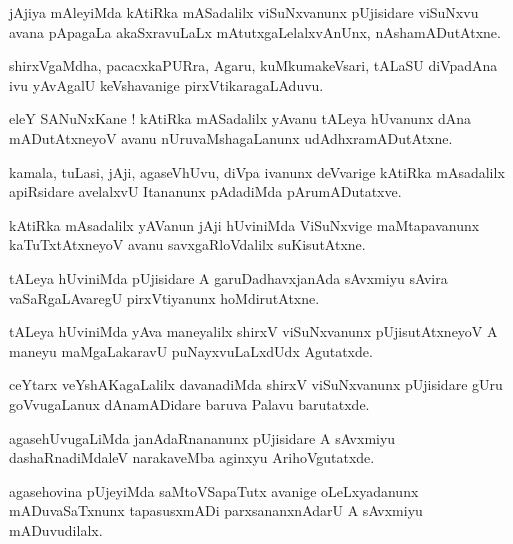 \documentclass{article}
\begin{document}
\begin{mn}%
jAjiya mAleyiMda kAtiRka mASadalilx viSuNxvanunx pUjisidare viSuNxvu avana pApagaLa akaSxravuLaLx 
mAtutxgaLelalxvAnUnx, nAshamADutAtxne.
\end{mn}

\begin{mn}%
shirxVgaMdha, pacacxkaPURra, Agaru, kuMkumakeVsari, tALaSU diVpadAna ivu yAvAgalU keVshavanige 
pirxVtikaragaLAduvu.
\end{mn}

\begin{mn}%
eleY SANuNxKane ! kAtiRka mASadalilx yAvanu tALeya hUvanunx dAna mADutAtxneyoV avanu 
nUruvaMshagaLanunx udAdhxramADutAtxne.
\end{mn}

\begin{mn}%
kamala, tuLasi, jAji, agaseVhUvu, diVpa ivanunx deVvarige kAtiRka mAsadalilx apiRsidare avelalxvU 
Itananunx pAdadiMda pArumADutatxve.
\end{mn}

\begin{mn}%
kAtiRka mAsadalilx yAVanun jAji hUviniMda ViSuNxvige maMtapavanunx kaTuTxtAtxneyoV avanu 
savxgaRloVdalilx suKisutAtxne.
\end{mn}

\begin{mn}%
tALeya hUviniMda pUjisidare A garuDadhavxjanAda sAvxmiyu sAvira vaSaRgaLAvaregU pirxVtiyanunx 
hoMdirutAtxne.
\end{mn}

\begin{mn}%
tALeya hUviniMda yAva maneyalilx shirxV viSuNxvanunx pUjisutAtxneyoV A maneyu maMgaLakaravU 
puNayxvuLaLxdUdx Agutatxde.
\end{mn}

\begin{mn}%
ceYtarx veYshAKagaLalilx davanadiMda shirxV viSuNxvanunx pUjisidare gUru goVvugaLanux dAnamADidare 
baruva Palavu barutatxde.
\end{mn}

\begin{mn}%
agasehUvugaLiMda janAdaRnananunx pUjisidare A sAvxmiyu dashaRnadiMdaleV narakaveMba aginxyu 
ArihoVgutatxde.
\end{mn}

\begin{mn}%
agasehovina pUjeyiMda saMtoVSapaTutx avanige oLeLxyadanunx mADuvaSaTxnunx tapasusxmADi 
parxsananxnAdarU A sAvxmiyu mADuvudilalx.
\end{mn}
\end{document}
